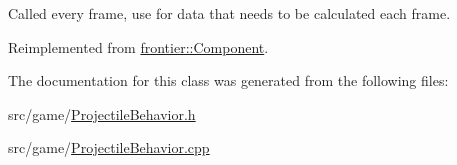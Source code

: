 Called every frame, use for data that needs to be calculated each frame. 



Reimplemented from \hyperlink{classfrontier_1_1_component_ab920f9bc07ce051ebb5559c5a66508d1}{frontier\+::\+Component}.



The documentation for this class was generated from the following files\+:\begin{DoxyCompactItemize}
\item 
src/game/\hyperlink{_projectile_behavior_8h}{Projectile\+Behavior.\+h}\item 
src/game/\hyperlink{_projectile_behavior_8cpp}{Projectile\+Behavior.\+cpp}\end{DoxyCompactItemize}
